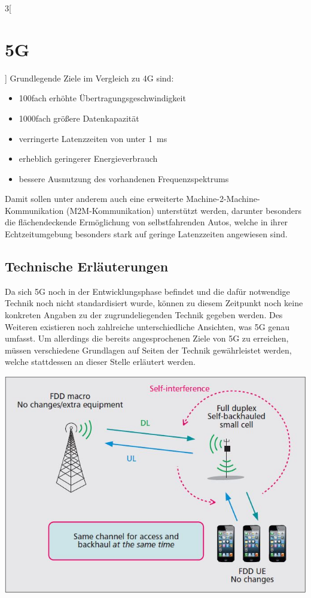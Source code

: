 \begin{multicols}{3}[\section{5G}]
Grundlegende Ziele im Vergleich zu 4G sind:\cite{5g.6}
\begin{itemize}
\item \si{100}fach erhöhte Übertragungsgeschwindigkeit
\item \si{1000}fach größere Datenkapazität
\item verringerte Latenzzeiten von unter \SI{1}{\milli\second}
\item erheblich geringerer Energieverbrauch 
\item bessere Ausnutzung des vorhandenen Frequenzspektrums
\end{itemize}
Damit sollen unter anderem auch eine erweiterte Machine-2-Machine-Kommunikation (M2M-Kommunikation) unterstützt werden, darunter besonders die flächendeckende Ermöglichung von selbstfahrenden Autos, welche in ihrer Echtzeitumgebung besonders stark auf geringe Latenzzeiten angewiesen sind. \cite{5g.1}
\subsection*{Technische Erläuterungen}
Da sich 5G noch in der Entwicklungsphase befindet und die dafür notwendige Technik noch nicht standardisiert wurde, können zu diesem Zeitpunkt noch keine konkreten Angaben zu der zugrundeliegenden Technik gegeben werden. Des Weiteren existieren noch zahlreiche unterschiedliche Ansichten, was 5G genau umfasst. 
Um allerdings die bereits angesprochenen Ziele von 5G zu erreichen, müssen verschiedene Grundlagen auf Seiten der Technik gewährleistet werden, welche stattdessen an dieser Stelle erläutert werden.
\begin{Figure}
\includegraphics[width=\linewidth]{Kapitel/5G/Grafiken/sic}
\label{fig:5g.sic}
\end{Figure}


\end{multicols}
